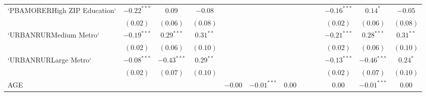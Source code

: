 \documentclass[12pt,twoside]{reedthesis}
\begin{document}
\begin{table}
\begin{center}
\begin{tiny}
\begin{tabular}{l@{} c@{} c@{} c@{} c@{} c@{} c@{} c@{} c@{} c@{} c@{} c@{} c@{} }
  `PBAMORERHigh ZIP Education`       & $\mathbf{-0.22}^{***}$ & $0.09$                 & $-0.08$                &                        &                        &                        &                        &                        &                        & $\mathbf{-0.16}^{***}$ & $0.14^{*}$             & $-0.05$                \\
                                     & $(0.02)$               & $(0.06)$               & $(0.08)$               &                        &                        &                        &                        &                        &                        & $(0.02)$               & $(0.06)$               & $(0.08)$               \\
  `URBANRURMedium Metro`             & $\mathbf{-0.19}^{***}$ & $\mathbf{0.29}^{***}$  & $0.31^{**}$            &                        &                        &                        &                        &                        &                        & $\mathbf{-0.21}^{***}$ & $\mathbf{0.28}^{***}$  & $0.31^{**}$            \\
                                     & $(0.02)$               & $(0.06)$               & $(0.10)$               &                        &                        &                        &                        &                        &                        & $(0.02)$               & $(0.06)$               & $(0.10)$               \\
  `URBANRURLarge Metro`              & $\mathbf{-0.08}^{***}$ & $\mathbf{-0.43}^{***}$ & $0.29^{**}$            &                        &                        &                        &                        &                        &                        & $\mathbf{-0.13}^{***}$ & $\mathbf{-0.46}^{***}$ & $0.24^{*}$             \\
                                     & $(0.02)$               & $(0.07)$               & $(0.10)$               &                        &                        &                        &                        &                        &                        & $(0.02)$               & $(0.07)$               & $(0.10)$               \\
  AGE                                &                        &                        &                        & $-0.00$                & $\mathbf{-0.01}^{***}$ & $0.00$                 &                        &                        &                        & $0.00$                 & $\mathbf{-0.01}^{***}$ & $0.00$                 \\

\end{tabular}
\end{tiny}
\end{center}
\end{table}
\end{document}
